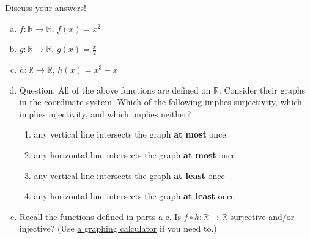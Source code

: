 \documentclass[12pt,letterpaper]{article}
\newcommand\R{\mathbb R}
\begin{document}
      Discuss your answers!
      \begin{enumerate}[a.]
      
		
		\item $f : \R \rightarrow \R$, $f(x) = x^2$

		\begin{mdframed} \vspace{1cm} \end{mdframed}
		
		 \item $g : \R \rightarrow \R$, $g(x) = \frac{x}{2}$

		\begin{mdframed} \vspace{1cm} \end{mdframed}
		
        \item $h:\R\rightarrow \R$, $h(x)=x^3-x$
        
        \begin{mdframed} \vspace{1cm} \end{mdframed}
        
         \item Question: All of the above functions are defined on $\R$. Consider their graphs in the coordinate system. Which of the following implies surjectivity, which implies injectivity, and which implies neither?
 \begin{enumerate}[(1)]
     \item any vertical line intersects the graph \textbf{at most} once
     \item any horizontal line intersects the graph \textbf{at most} once
      \item any vertical line intersects the graph \textbf{at least} once
     \item any horizontal line intersects the graph \textbf{at least}  once
 \end{enumerate}

\begin{mdframed} \vspace{2cm} \end{mdframed}

        \item Recall the functions defined in parts a-c. Is $f\circ h:\R\rightarrow \R$ surjective and/or injective? (Use \href{https://www.desmos.com/calculator}{\color{blue} a graphing calculator} if you need to.)
        
        \begin{mdframed} \vspace{1cm} \end{mdframed}
        

\end{enumerate}
\end{document}
